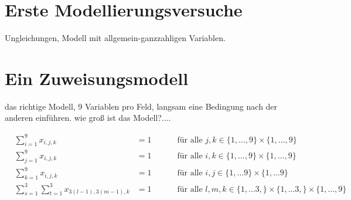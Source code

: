 \section{Erste Modellierungsversuche}
Ungleichungen, Modell mit allgemein-ganzzahligen Variablen.

\section{Ein Zuweisungsmodell}
das richtige Modell, 9 Variablen pro Feld, langsam eine Bedingung nach
der anderen einführen. wie groß ist das Modell?....

\[
  \begin{alignedat}{3}
    & \sum_{i = 1}^9 x_{i,j,k} & =1     & \qquad\text{ f\"ur alle }
    j,k \in \{1,\dots,9\}\times\{1,\dots,9\}\\
    & \sum_{j = 1}^9 x_{i,j,k} & =1     & \qquad\text{ f\"ur alle }
    i,k \in \{1,\dots,9\}\times\{1,\dots,9\}\\
    & \sum_{k = 1}^9 x_{i,j,k} & =1     & \qquad\text{ f\"ur alle }
    i,j \in \{1,\dots9\}\times\{1,\dots9\}\\
    & \sum_{s = 1}^3\sum_{t = 1}^3 x_{3(l-1),3(m-1),k} & =1     & \qquad\text{ f\"ur alle }
    l,m,k \in \{1,\dots3,\}\times\{1,\dots3,\}\times\{1,\dots,9\}\\
  \end{alignedat}
\]

